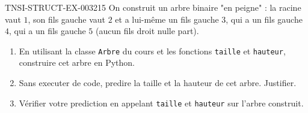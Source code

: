 \begin{exercice}{TNSI-STRUCT-EX-003}{2}{15}
On construit un arbre binaire "en peigne" : la racine vaut $1$, son fils gauche vaut $2$ et a lui-même un fils gauche $3$, qui a un fils gauche $4$, qui a un fils gauche $5$ (aucun fils droit nulle part).
\begin{enumerate}
  \item En utilisant la classe \lstinline{Arbre} du cours et les fonctions \lstinline{taille} et \lstinline{hauteur}, construire cet arbre en Python.
  \item Sans executer de code, predire la taille et la hauteur de cet arbre. Justifier.
  \item Vérifier votre prediction en appelant \lstinline{taille} et \lstinline{hauteur} sur l'arbre construit.
\end{enumerate}
\end{exercice}

